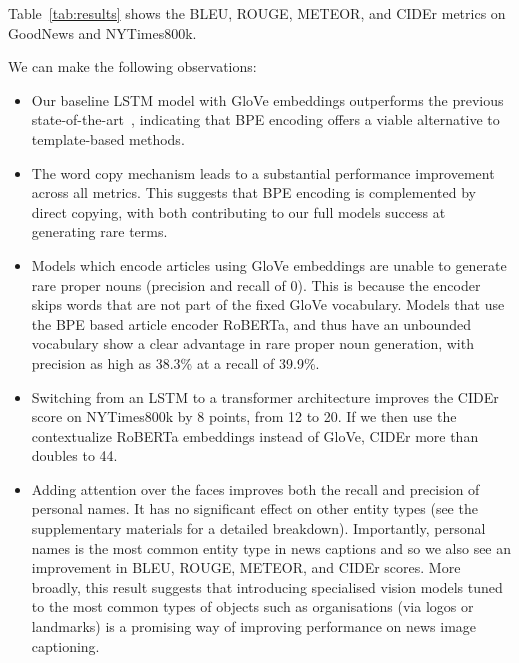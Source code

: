 
Table~\ref{tab:results} shows the BLEU, ROUGE, METEOR, and CIDEr metrics on
GoodNews and NYTimes800k.

We can make the following observations:

\begin{itemize}
   \item Our baseline LSTM model with GloVe embeddings outperforms the previous
   state-of-the-art~\cite{Biten2019GoodNews}, indicating that BPE encoding
   offers a viable alternative to template-based methods.

   \item The word copy mechanism leads to a substantial performance improvement
   across all metrics. This suggests that BPE encoding is complemented by
   direct copying, with both contributing to our full models success at
   generating rare terms.

   \item Models which encode articles using GloVe embeddings are unable to
   generate rare proper nouns (precision and recall of 0).
   This is because the encoder skips words that are not part of the fixed GloVe
   vocabulary. Models that use the BPE based article encoder RoBERTa, and thus
   have an unbounded vocabulary show
   a clear advantage in rare proper noun generation, with precision as high as
   38.3\% at a recall of 39.9\%.

   \item Switching from an LSTM to a transformer architecture improves the
   CIDEr score on NYTimes800k by 8 points, from 12 to 20. If we then use the
   contextualize RoBERTa embeddings instead of GloVe, CIDEr more than doubles
   to 44.

   \item Adding attention over the faces improves both the recall and precision
   of personal names. It has no significant effect on other entity types (see
   the supplementary materials for a detailed breakdown). Importantly, personal
   names is the most common entity type in news captions and so we also see an
   improvement in BLEU, ROUGE, METEOR, and CIDEr scores. More broadly, this
   result suggests that introducing specialised vision models tuned to the most
   common types of objects such as organisations (via logos or landmarks) is a
   promising way of improving performance on news image captioning.


\end{itemize}

